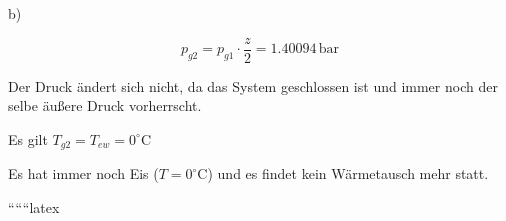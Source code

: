 b)

\[
p_{g2} = p_{g1} \cdot \frac{z}{2} = 1.40094 \, \text{bar}
\]

Der Druck ändert sich nicht, da das System geschlossen ist und immer noch der selbe äußere Druck vorherrscht.

Es gilt \( T_{g2} = T_{ew} = 0^\circ \text{C} \)

Es hat immer noch Eis (\(T = 0^\circ \text{C}\)) und es findet kein Wärmetausch mehr statt.

``````latex